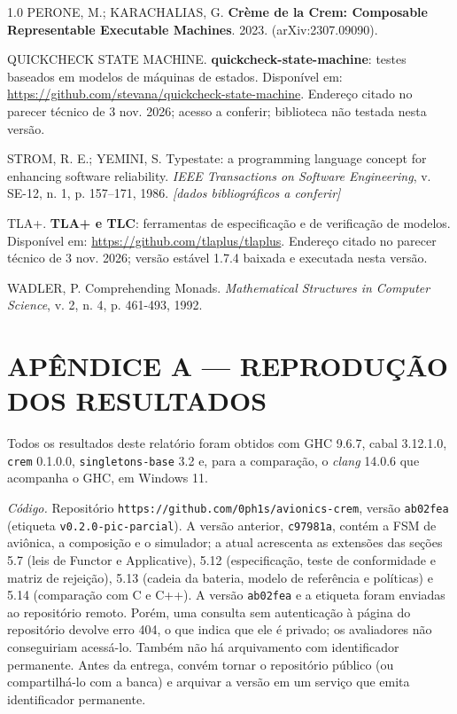 \documentclass[12pt,a4paper]{article}
\begin{document}
\begin{spacing}{1.0}
PERONE, M.; KARACHALIAS, G. \textbf{Crème de la Crem: Composable Representable Executable Machines}. 2023. (arXiv:2307.09090).

QUICKCHECK STATE MACHINE. \textbf{quickcheck-state-machine}: testes baseados em modelos de máquinas de estados. Disponível em: \url{https://github.com/stevana/quickcheck-state-machine}. Endereço citado no parecer técnico de 3 nov. 2026; acesso a conferir; biblioteca não testada nesta versão.

STROM, R. E.; YEMINI, S. Typestate: a programming language concept for enhancing software reliability. \textit{IEEE Transactions on Software Engineering}, v. SE-12, n. 1, p. 157--171, 1986. \textit{[dados bibliográficos a conferir]}

TLA+. \textbf{TLA+ e TLC}: ferramentas de especificação e de verificação de modelos. Disponível em: \url{https://github.com/tlaplus/tlaplus}. Endereço citado no parecer técnico de 3 nov. 2026; versão estável 1.7.4 baixada e executada nesta versão.

WADLER, P. Comprehending Monads. \textit{Mathematical Structures in Computer Science}, v. 2, n. 4, p. 461-493, 1992.

\end{spacing}
\endgroup


\newpage
\section*{APÊNDICE A --- REPRODUÇÃO DOS RESULTADOS}

Todos os resultados deste relatório foram obtidos com GHC 9.6.7, cabal 3.12.1.0, \texttt{crem} 0.1.0.0, \texttt{singletons-base} 3.2 e, para a comparação, o \textit{clang} 14.0.6 que acompanha o GHC, em Windows 11.

\textit{Código.} Repositório \texttt{https://github.com/0ph1s/avionics-crem}, versão \texttt{ab02fea} (etiqueta \texttt{v0.2.0-pic-parcial}). A versão anterior, \texttt{c97981a}, contém a FSM de aviônica, a composição e o simulador; a atual acrescenta as extensões das seções 5.7 (leis de Functor e Applicative), 5.12 (especificação, teste de conformidade e matriz de rejeição), 5.13 (cadeia da bateria, modelo de referência e políticas) e 5.14 (comparação com C e C++). A versão \texttt{ab02fea} e a etiqueta foram enviadas ao repositório remoto. Porém, uma consulta sem autenticação à página do repositório devolve erro 404, o que indica que ele é privado; os avaliadores não conseguiriam acessá-lo. Também não há arquivamento com identificador permanente. Antes da entrega, convém tornar o repositório público (ou compartilhá-lo com a banca) e arquivar a versão em um serviço que emita identificador permanente.
\end{document}
